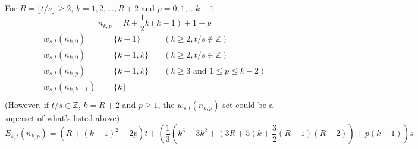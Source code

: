 \documentclass[]{article}
\begin{document}
\vspace{1cm}
\begin{lemma}[Mode $M_1$]  For $R = \lfloor t/s\rfloor \geq 2$, $k = 1,2,\dots,R + 2$ and  $p = 0, 1, \dots k - 1$
	\[
		n_{k,p} = R + \frac{1}{2}k(k-1) + 1 + p
	\]
	\begin{align*}
	    w_{s,t}(n_{k, 0}) &= \{k-1\} &\quad(k\geq 2, t/s\notin\mathbb{Z})\\
	    w_{s,t}(n_{k, 0}) &= \{k-1, k\} &\quad(k\geq 2, t/s\in\mathbb{Z})\\
	    w_{s,t}(n_{k, p}) &= \{k-1, k\}&\quad (k\geq 3 \text{ and } 1 \leq p\leq k-2)\\
	    w_{s,t}(n_{k, k-1}) &= \{k\}\\
	\end{align*}
	(However, if $t/s\in\mathbb{Z}$, $k=R+2$ and $p \geq 1$, the $w_{s,t}(n_{k, p})$ set could be a superset of what's listed above)
	\[
	E_{s,t}(n_{k, p}) = \left(R+(k-1)^2+2p\right)t + \left( \frac{1}{3}(k^3-3k^2+(3R+5)k+\frac{3}{2}(R+1)(R-2)) + p(k-1) \right) s
	\]
\end{lemma}
\end{document}
